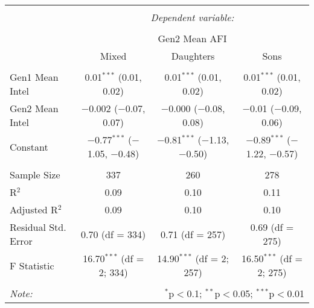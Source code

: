 
\begingroup 
\small 
\begin{tabular}{@{\extracolsep{1pt}}lccc} 
\\[-1.8ex]\hline 
\hline \\[-1.8ex] 
 & \multicolumn{3}{c}{\textit{Dependent variable:}} \\ 
\cline{2-4} 
\\[-1.8ex] & \multicolumn{3}{c}{Gen2 Mean AFI} \\ 
 & Mixed & Daughters & Sons \\ 
\hline \\[-1.8ex] 
 Gen1 Mean Intel & 0.01$^{***}$ (0.01, 0.02) & 0.01$^{***}$ (0.01, 0.02) & 0.01$^{***}$ (0.01, 0.02) \\ 
  Gen2 Mean Intel & $-$0.002 ($-$0.07, 0.07) & $-$0.000 ($-$0.08, 0.08) & $-$0.01 ($-$0.09, 0.06) \\ 
  Constant & $-$0.77$^{***}$ ($-$1.05, $-$0.48) & $-$0.81$^{***}$ ($-$1.13, $-$0.50) & $-$0.89$^{***}$ ($-$1.22, $-$0.57) \\ 
 \hline \\[-1.8ex] 
Sample Size & 337 & 260 & 278 \\ 
R$^{2}$ & 0.09 & 0.10 & 0.11 \\ 
Adjusted R$^{2}$ & 0.09 & 0.10 & 0.10 \\ 
Residual Std. Error & 0.70 (df = 334) & 0.71 (df = 257) & 0.69 (df = 275) \\ 
F Statistic & 16.70$^{***}$ (df = 2; 334) & 14.90$^{***}$ (df = 2; 257) & 16.50$^{***}$ (df = 2; 275) \\ 
\hline 
\hline \\[-1.8ex] 
\textit{Note:}  & \multicolumn{3}{r}{$^{*}$p$<$0.1; $^{**}$p$<$0.05; $^{***}$p$<$0.01} \\ 
\end{tabular} 
\endgroup 
